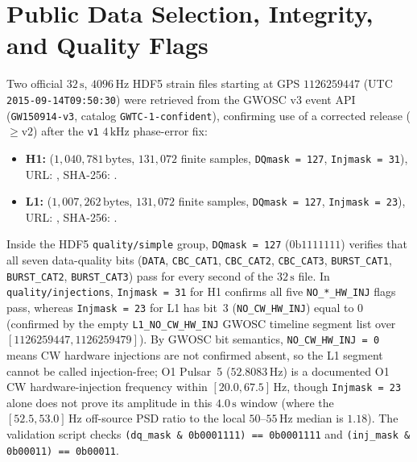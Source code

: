 \documentclass[11pt,a4paper]{report}
\begin{document}
\section{Public Data Selection, Integrity, and Quality Flags}
Two official $32\,\mathrm{s}$, $4096\,\mathrm{Hz}$ HDF5 strain files starting at GPS $1126259447$ (UTC \texttt{2015-09-14T09:50:30}) were retrieved from the GWOSC v3 event API (\texttt{GW150914-v3}, catalog \texttt{GWTC-1-confident}), confirming use of a corrected release ($\ge\mathrm{v2}$) after the \texttt{v1} $4\,\mathrm{kHz}$ phase-error fix:
\begin{itemize}[leftmargin=1.5em]
    \item \textbf{H1:}  ($1{,}040{,}781\,\mathrm{bytes}$, $131{,}072$ finite samples, \texttt{DQmask = 127}, \texttt{Injmask = 31}), URL: , SHA-256: .
    \item \textbf{L1:}  ($1{,}007{,}262\,\mathrm{bytes}$, $131{,}072$ finite samples, \texttt{DQmask = 127}, \texttt{Injmask = 23}), URL: , SHA-256: .
\end{itemize}
Inside the HDF5 \texttt{quality/simple} group, \texttt{DQmask = 127} ($0\mathrm{b}1111111$) verifies that all seven data-quality bits (\texttt{DATA}, \texttt{CBC\_CAT1}, \texttt{CBC\_CAT2}, \texttt{CBC\_CAT3}, \texttt{BURST\_CAT1}, \texttt{BURST\_CAT2}, \texttt{BURST\_CAT3}) pass for every second of the $32\,\mathrm{s}$ file. In \texttt{quality/injections}, \texttt{Injmask = 31} for H1 confirms all five \texttt{NO\_*\_HW\_INJ} flags pass, whereas \texttt{Injmask = 23} for L1 has bit~3 (\texttt{NO\_CW\_HW\_INJ}) equal to $0$ (confirmed by the empty \texttt{L1\_NO\_CW\_HW\_INJ} GWOSC timeline segment list over $[1126259447, 1126259479]$). By GWOSC bit semantics, \texttt{NO\_CW\_HW\_INJ = 0} means CW hardware injections are not confirmed absent, so the L1 segment cannot be called injection-free; O1 Pulsar~5 ($52.8083\,\mathrm{Hz}$) is a documented O1 CW hardware-injection frequency within $[20.0, 67.5]\,\mathrm{Hz}$, though \texttt{Injmask = 23} alone does not prove its amplitude in this $4.0\,\mathrm{s}$ window (where the $[52.5, 53.0]\,\mathrm{Hz}$ off-source PSD ratio to the local $50$--$55\,\mathrm{Hz}$ median is $1.18$). The validation script checks \texttt{(dq\_mask \& 0b0001111) == 0b0001111} and \texttt{(inj\_mask \& 0b00011) == 0b00011}.
\end{document}
